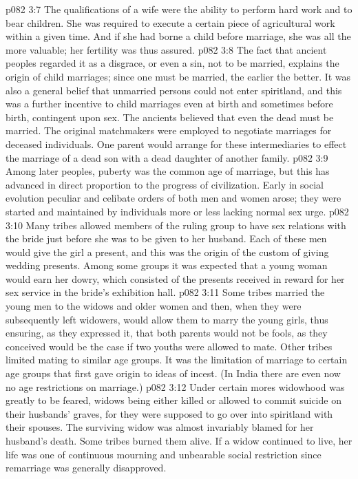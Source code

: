 \vs p082 3:7 The qualifications of a wife were the ability to perform hard work and to bear children. She was required to execute a certain piece of agricultural work within a given time. And if she had borne a child before marriage, she was all the more valuable; her fertility was thus assured.
\vs p082 3:8 \pc The fact that ancient peoples regarded it as a disgrace, or even a sin, not to be married, explains the origin of child marriages; since one must be married, the earlier the better. It was also a general belief that unmarried persons could not enter spiritland, and this was a further incentive to child marriages even at birth and sometimes before birth, contingent upon sex. The ancients believed that even the dead must be married. The original matchmakers were employed to negotiate marriages for deceased individuals. One parent would arrange for these intermediaries to effect the marriage of a dead son with a dead daughter of another family.
\vs p082 3:9 Among later peoples, puberty was the common age of marriage, but this has advanced in direct proportion to the progress of civilization. Early in social evolution peculiar and celibate orders of both men and women arose; they were started and maintained by individuals more or less lacking normal sex urge.
\vs p082 3:10 Many tribes allowed members of the ruling group to have sex relations with the bride just before she was to be given to her husband. Each of these men would give the girl a present, and this was the origin of the custom of giving wedding presents. Among some groups it was expected that a young woman would earn her dowry, which consisted of the presents received in reward for her sex service in the bride’s exhibition hall.
\vs p082 3:11 Some tribes married the young men to the widows and older women and then, when they were subsequently left widowers, would allow them to marry the young girls, thus ensuring, as they expressed it, that both parents would not be fools, as they conceived would be the case if two youths were allowed to mate. Other tribes limited mating to similar age groups. It was the limitation of marriage to certain age groups that first gave origin to ideas of incest. (In India there are even now no age restrictions on marriage.)
\vs p082 3:12 \pc Under certain mores widowhood was greatly to be feared, widows being either killed or allowed to commit suicide on their husbands’ graves, for they were supposed to go over into spiritland with their spouses. The surviving widow was almost invariably blamed for her husband’s death. Some tribes burned them alive. If a widow continued to live, her life was one of continuous mourning and unbearable social restriction since remarriage was generally disapproved.
